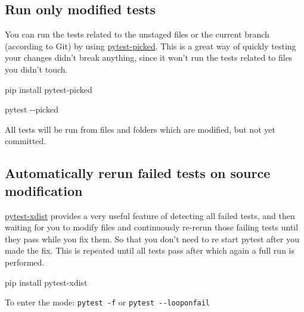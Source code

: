 \documentclass[
]{report}
\newenvironment{Shaded}{\begin{snugshade}}{\end{snugshade}}
\newcommand{\AttributeTok}[1]{\textcolor[rgb]{0.40,0.45,0.13}{#1}}
\newcommand{\ExtensionTok}[1]{\textcolor[rgb]{0.00,0.23,0.31}{#1}}
\newcommand{\NormalTok}[1]{\textcolor[rgb]{0.00,0.23,0.31}{#1}}
\begin{document}
\subsection{Run only modified tests}\label{run-only-modified-tests}

You can run the tests related to the unstaged files or the current
branch (according to Git) by using
\href{https://github.com/anapaulagomes/pytest-picked}{pytest-picked}.
This is a great way of quickly testing your changes didn't break
anything, since it won't run the tests related to files you didn't
touch.

\begin{Shaded}
\begin{Highlighting}[]
\ExtensionTok{pip}\NormalTok{ install pytest{-}picked}
\end{Highlighting}
\end{Shaded}

\begin{Shaded}
\begin{Highlighting}[]
\ExtensionTok{pytest} \AttributeTok{{-}{-}picked}
\end{Highlighting}
\end{Shaded}

All tests will be run from files and folders which are modified, but not
yet committed.

\subsection{Automatically rerun failed tests on source
modification}\label{automatically-rerun-failed-tests-on-source-modification}

\href{https://github.com/pytest-dev/pytest-xdist}{pytest-xdist} provides
a very useful feature of detecting all failed tests, and then waiting
for you to modify files and continuously re-rerun those failing tests
until they pass while you fix them. So that you don't need to re start
pytest after you made the fix. This is repeated until all tests pass
after which again a full run is performed.

\begin{Shaded}
\begin{Highlighting}[]
\ExtensionTok{pip}\NormalTok{ install pytest{-}xdist}
\end{Highlighting}
\end{Shaded}

To enter the mode: \texttt{pytest\ -f} or
\texttt{pytest\ -\/-looponfail}
\end{document}
